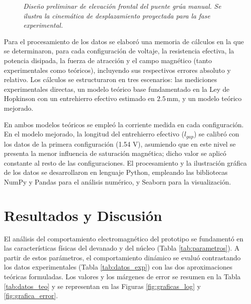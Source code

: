 \begin{figure}[H]
{%
  }
  \caption{\textit{Diseño preliminar de elevación frontal del puente grúa manual. Se ilustra la cinemática de desplazamiento proyectada para la fase experimental.}}
  \label{fig:esquema_grua}
\end{figure}

Para el procesamiento de los datos se elaboró una memoria de cálculos en la que se determinaron, para cada configuración de voltaje, la resistencia efectiva, la potencia disipada, la fuerza de atracción y el campo magnético (tanto experimentales como teóricos), incluyendo sus respectivos errores absoluto y relativo. Los cálculos se estructuraron en tres escenarios: las mediciones experimentales directas, un modelo teórico base fundamentado en la Ley de Hopkinson con un entrehierro efectivo estimado en $2.5 \, \text{mm}$, y un modelo teórico mejorado.

En ambos modelos teóricos se empleó la corriente medida en cada configuración. En el modelo mejorado, la longitud del entrehierro efectivo ($l_{gap}$) se calibró con los datos de la primera configuración (1.54 V), asumiendo que en este nivel se presenta la menor influencia de saturación magnética; dicho valor se aplicó constante al resto de las configuraciones. El procesamiento y la ilustración gráfica de los datos se desarrollaron en lenguaje Python, empleando las bibliotecas NumPy y Pandas para el análisis numérico, y Seaborn para la visualización.

\section{Resultados y Discusión}

El análisis del comportamiento electromagnético del prototipo se fundamentó en las características físicas del devanado y del núcleo (Tabla \ref{tab:parametros}). A partir de estos parámetros, el comportamiento dinámico se evaluó contrastando los datos experimentales (Tabla \ref{tab:datos_exp}) con las dos aproximaciones teóricas formuladas. Los valores y los márgenes de error se resumen en la Tabla \ref{tab:datos_teo} y se representan en las Figuras \ref{fig:graficas_log} y \ref{fig:grafica_error}.


